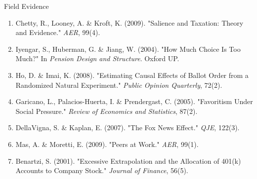 \documentclass[10pt]{beamer}
\begin{document}
\begin{frame}[allowframebreaks]{Field Evidence}
\begin{enumerate}
\item Chetty, R., Looney, A. \& Kroft, K. (2009). "Salience and Taxation: Theory and Evidence." \emph{AER}, 99(4).
\item Iyengar, S., Huberman, G. \& Jiang, W. (2004). "How Much Choice Is Too Much?" In \emph{Pension Design and Structure}. Oxford UP.
\item Ho, D. \& Imai, K. (2008). "Estimating Causal Effects of Ballot Order from a Randomized Natural Experiment." \emph{Public Opinion Quarterly}, 72(2).
\item Garicano, L., Palacios-Huerta, I. \& Prendergast, C. (2005). "Favoritism Under Social Pressure." \emph{Review of Economics and Statistics}, 87(2).
\item DellaVigna, S. \& Kaplan, E. (2007). "The Fox News Effect." \emph{QJE}, 122(3).
\item Mas, A. \& Moretti, E. (2009). "Peers at Work." \emph{AER}, 99(1).
\item Benartzi, S. (2001). "Excessive Extrapolation and the Allocation of 401(k) Accounts to Company Stock." \emph{Journal of Finance}, 56(5).
\end{enumerate}
\end{frame}
\end{document}
